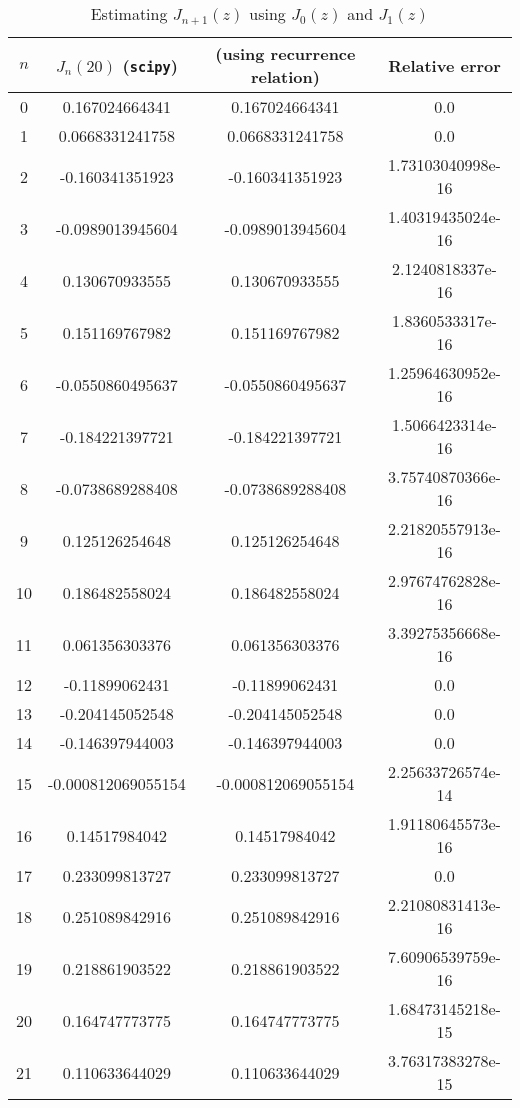 \documentclass[10pt]{article}
\begin{document}
\begin{table}[H] 
\caption{Estimating $ J_{n+1}(z) $ using $ J_0(z) $ and $ J_1(z) $} %
\centering %
\begin{tabular}{c c c c} %
\hline\hline %
$n$ & $J_n(20)$ (\verb+scipy+) & (using recurrence relation) & Relative error \\ [0.5ex] %
\hline %
0 & 0.167024664341 & 0.167024664341 & 0.0 \\
1 & 0.0668331241758 & 0.0668331241758 & 0.0 \\
2 & -0.160341351923 & -0.160341351923 & 1.73103040998e-16 \\
3 & -0.0989013945604 & -0.0989013945604 & 1.40319435024e-16 \\
4 & 0.130670933555 & 0.130670933555 & 2.1240818337e-16 \\
5 & 0.151169767982 & 0.151169767982 & 1.8360533317e-16 \\
6 & -0.0550860495637 & -0.0550860495637 & 1.25964630952e-16 \\
7 & -0.184221397721 & -0.184221397721 & 1.5066423314e-16 \\
8 & -0.0738689288408 & -0.0738689288408 & 3.75740870366e-16 \\
9 & 0.125126254648 & 0.125126254648 & 2.21820557913e-16 \\
10 & 0.186482558024 & 0.186482558024 & 2.97674762828e-16 \\
11 & 0.061356303376 & 0.061356303376 & 3.39275356668e-16 \\
12 & -0.11899062431 & -0.11899062431 & 0.0 \\
13 & -0.204145052548 & -0.204145052548 & 0.0 \\
14 & -0.146397944003 & -0.146397944003 & 0.0 \\
15 & -0.000812069055154 & -0.000812069055154 & 2.25633726574e-14 \\
16 & 0.14517984042 & 0.14517984042 & 1.91180645573e-16 \\
17 & 0.233099813727 & 0.233099813727 & 0.0 \\
18 & 0.251089842916 & 0.251089842916 & 2.21080831413e-16 \\
19 & 0.218861903522 & 0.218861903522 & 7.60906539759e-16 \\
20 & 0.164747773775 & 0.164747773775 & 1.68473145218e-15 \\
21 & 0.110633644029 & 0.110633644029 & 3.76317383278e-15 \\

\end{tabular}
\end{table}
\end{document}
